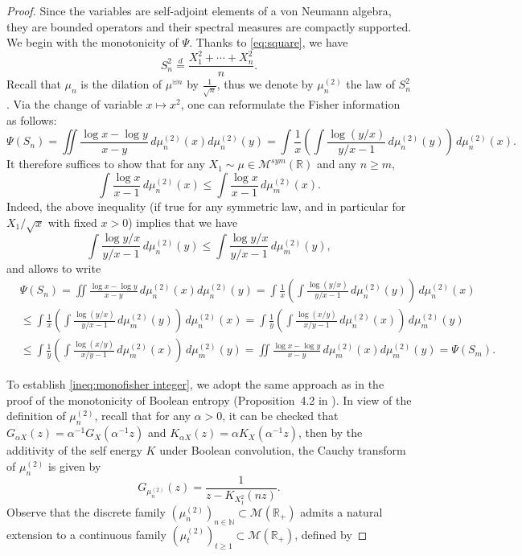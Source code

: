 \documentclass[10pt, reqno]{amsart}
\numberwithin{equation}{section}
\theoremstyle{definition}
\theoremstyle{plain}
\theoremstyle{remark}
\newcommand{\R}{\mathbb{R}}
\newcommand{\1}{\mathbbm{1}}
\newcommand{\probmsymr}{\mathcal{M}^{sym}(\R)}
\begin{document}
    \begin{proof}Since the
variables are self-adjoint elements of a von Neumann algebra, they are bounded operators and their spectral measures are compactly supported. 
        We begin with the monotonicity of $\Psi$. Thanks to \eqref{eq:square}, we have 
        \[
        S_n^2 \stackrel{d}{=} \frac{X_1^2+\cdots+X_n^2}{n}.
        \]
        Recall that $\mu_n$ is the dilation of $\mu^{\uplus n}$ by $\frac{1}{\sqrt{n}}$, thus we denote by $\mu^{(2)}_n$ the law of $S_n^2$. Via the change of variable $x\mapsto x^2$, one can reformulate the Fisher information as follows:
        \begin{equation*}
	        \Psi(S_n) = \iint \frac{\log x-\log y}{x-y}\,d\mu^{(2)}_n(x)d\mu^{(2)}_n(y) = \int \frac{1}{x}\left(\int \frac{\log (y/x)}{y/x-1}\,d\mu^{(2)}_n(y)\right)\,d\mu^{(2)}_n(x).
        \end{equation*}
        It therefore suffices to show that for any $X_1\sim\mu\in\probmsymr$ and any $n\ge m$,
        \begin{equation}\label{ineq:monofisher integer}
	          \int \frac{\log x}{x-1}\,d\mu^{(2)}_n(x) \le \int \frac{\log x}{x-1}\,d\mu^{(2)}_m(x).
        \end{equation}
        Indeed, the above inequality (if true for any symmetric law, and in particular for $X_1/\sqrt{x}$ with fixed $x>0$) implies that we have
        $$          \int \frac{\log y/x}{y/x-1}\,d\mu^{(2)}_n(y) \le \int \frac{\log y/x}{y/x-1}\,d\mu^{(2)}_m(y), $$
and allows to write   
        \begin{align*}
            &\Psi(S_n)=\iint \frac{\log x-\log y}{x-y}\,d\mu^{(2)}_n(x)d\mu^{(2)}_n(y) =\int \frac{1}{x}\left(\int \frac{\log (y/x)}{y/x-1}\,d\mu^{(2)}_n(y)\right)\,d\mu^{(2)}_n(x)\\
            &\le \int \frac{1}{x}\left(\int \frac{\log (y/x)}{y/x-1}\,d\mu^{(2)}_m(y)\right)\,d\mu^{(2)}_n(x)=\int \frac{1}{y}\left(\int \frac{\log (x/y)}{x/y-1}\,d\mu^{(2)}_n(x)\right)\,d\mu^{(2)}_m(y)\\
            &\leq \int \frac{1}{y}\left(\int \frac{\log (x/y)}{x/y-1}\,d\mu^{(2)}_m(x)\right)\,d\mu^{(2)}_m(y)
            = \iint \frac{\log x-\log y}{x-y}\,d\mu^{(2)}_m(x)d\mu^{(2)}_m(y) = \Psi(S_m).
        \end{align*}
        
        To establish \eqref{ineq:monofisher integer}, we adopt the same approach as in the proof of the monotonicity of Boolean entropy (Proposition~4.2 in \cite{pan2025entropy}). In view of the definition of $\mu^{(2)}_n$, recall that for any $\alpha>0$, it can be checked that $G_{\alpha X}(z) = \alpha^{-1}G_X(\alpha^{-1}z)$ and $K_{\alpha X}(z)=\alpha K_X(\alpha^{-1}z)$, then by the additivity of the self energy $K$ under Boolean convolution, the Cauchy transform of $\mu^{(2)}_n$ is given by
        \begin{equation*}
            G_{\mu^{(2)}_n}(z)=\frac{1}{z-K_{X_1^2}(nz)}.
        \end{equation*}
        Observe that the discrete family $(\mu^{(2)}_n)_{n\in\mathbb{N}} \subset \mathcal{M}(\R_+)$ admits a natural extension to a continuous family $(\mu^{(2)}_t)_{t\ge 1} \subset \mathcal{M}(\R_+)$, 
defined by


\end{proof}
\end{document}
